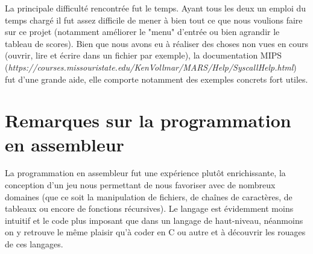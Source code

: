 \documentclass[french]{article}
\begin{document}
La principale difficulté rencontrée fut le temps. Ayant tous les deux un emploi du temps chargé il fut assez difficile de mener à bien tout ce que nous voulions faire sur ce projet (notamment améliorer le "menu" d'entrée ou bien agrandir le tableau de scores).
Bien que nous avons eu à réaliser des choses non vues en cours (ouvrir, lire et écrire dans un fichier par exemple), la documentation MIPS (\emph{https://courses.missouristate.edu/KenVollmar/MARS/Help/SyscallHelp.html}) fut d'une grande aide, elle comporte notamment des exemples concrets fort utiles.

\section{Remarques sur la programmation en assembleur}

La programmation en assembleur fut une expérience plutôt enrichissante, la conception d'un jeu nous permettant de nous favoriser avec de nombreux domaines (que ce soit la manipulation de fichiers, de chaînes de caractères, de tableaux ou encore de fonctions récursives). Le langage est évidemment moins intuitif et le code plus imposant que dans un langage de haut-niveau, néanmoins on y retrouve le même plaisir qu'à coder en C ou autre et à découvrir les rouages de ces langages.
\end{document}
